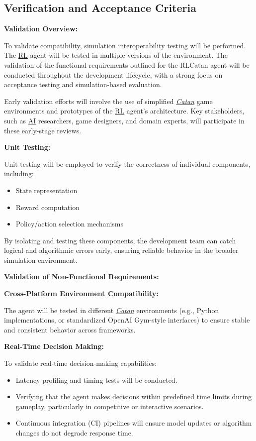 \documentclass{article}
\newcommand{\Catan}{\href{https://en.wikipedia.org/wiki/Catan}{Catan}}
\newcommand{\AI}{\href{https://en.wikipedia.org/wiki/Artificial_intelligence}{AI}}
\newcommand{\RL}{\href{https://www.ibm.com/think/topics/reinforcement-learning}{RL}}
\begin{document}
\subsection{Verification and Acceptance Criteria}\label{subsec:verification-and-acceptance-criteria}

\noindent\textbf{Validation Overview:}

To validate compatibility, simulation interoperability testing will be performed. The \RL{} agent will be tested in multiple versions of the environment. The validation of the functional requirements outlined for the RLCatan agent will be conducted throughout the development lifecycle, with a strong focus on acceptance testing and simulation-based evaluation.

Early validation efforts will involve the use of simplified \emph{\Catan{}} game environments and prototypes of the \RL{} agent's architecture. Key stakeholders, such as \AI{} researchers, game designers, and domain experts, will participate in these early-stage reviews.

\noindent\textbf{Unit Testing:}

Unit testing will be employed to verify the correctness of individual components, including:
\begin{itemize}
    \item State representation
    \item Reward computation
    \item Policy/action selection mechanisms
\end{itemize}

By isolating and testing these components, the development team can catch logical and algorithmic errors early, ensuring reliable behavior in the broader simulation environment.

\noindent\textbf{Validation of Non-Functional Requirements:}

\noindent\textbf{Cross-Platform Environment Compatibility:}

The agent will be tested in different \emph{\Catan{}} environments (e.g., Python implementations, or standardized OpenAI Gym-style interfaces) to ensure stable and consistent behavior across frameworks.

\noindent\textbf{Real-Time Decision Making:}

To validate real-time decision-making capabilities:
\begin{itemize}
    \item Latency profiling and timing tests will be conducted.
    \item Verifying that the agent makes decisions within predefined time limits during gameplay, particularly in competitive or interactive scenarios.
    \item Continuous integration (CI) pipelines will ensure model updates or algorithm changes do not degrade response time.
\end{itemize}
\end{document}
